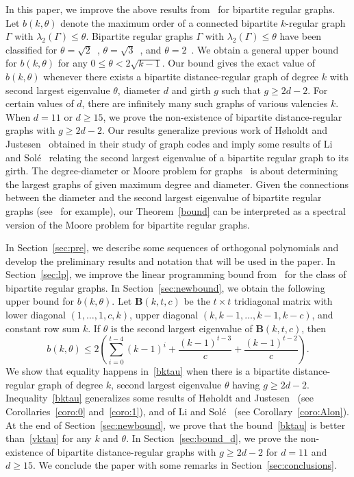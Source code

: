 \documentclass[ALCO,ThmDefs,Unicode,epreuves]{cedram}
\begin{document}
In this paper, we improve the above results from~\cite{CKNV16} for bipartite regular graphs. Let $b(k,\theta)$ denote the maximum order of a connected bipartite $k$-regular graph $\Gamma$ with $\lambda_2(\Gamma) \leq \theta$. Bipartite regular graphs $\Gamma$ with $\lambda_2(\Gamma) \leq \theta$ have been classified for $\theta=\sqrt{2}$~\cite{TY00}, $\theta=\sqrt{3}$~\cite{KS13}, and $\theta=2$~\cite{KS14}. We obtain a general upper bound for $b(k,\theta)$ for any $0\leq \theta< 2\sqrt{k-1}$. Our bound gives the exact value of $b(k,\theta)$ whenever there exists a bipartite distance-regular graph of degree $k$ with second largest eigenvalue $\theta$, diameter $d$ and girth $g$ such that $g\geq 2d-2$. For certain values of $d$, there are infinitely many such graphs of various valencies $k$. When $d=11$ or $d\geq 15$, we prove the non-existence of bipartite distance-regular graphs with $g\geq 2d-2$. Our results generalize previous work of H\o holdt and Justesen~\cite{HJ14} obtained in their study of graph codes and imply some results of Li and Sol\'{e}~\cite{CLS96} relating the second largest eigenvalue of a bipartite regular graph to its girth. The degree-diameter or Moore problem for graphs~\cite{MS} is about determining the largest graphs of given maximum degree and diameter. Given the connections between the diameter and the second largest eigenvalue of bipartite regular graphs (see~\cite{Ch89} for example), our Theorem~\ref{bound} can be interpreted as a spectral version of the Moore problem for bipartite regular graphs. 

In Section~\ref{sec:pre}, we describe some sequences of orthogonal polynomials and develop the preliminary results and notation that will be used in the paper. In Section~\ref{sec:lp}, we improve the linear programming bound from~\cite{N} for the class of bipartite regular graphs. In Section~\ref{sec:newbound}, we obtain the following upper bound for $b(k,\theta)$. Let $\boldsymbol{B}(k,t,c)$ be the $t \times t$ tridiagonal matrix with lower diagonal $(1,\ldots,1,c,k)$, upper diagonal $(k,k-1,\ldots, k-1,k-c)$, and constant row sum $k$. 
If $\theta$ is the second largest eigenvalue of $\boldsymbol{B}(k,t,c)$, then
\begin{equation}\label{bktau}
b(k,\theta) \leq 2\left(\sum_{i=0}^{t-4} (k-1)^{i}+ \frac{(k-1)^{t-3}}{c}+\frac{(k-1)^{t-2}}{c}\right). 
\end{equation}
We show that equality happens in~\eqref{bktau} when there is a bipartite distance-regular graph of degree $k$, second largest eigenvalue $\theta$ having $g\geq 2d-2$. Inequality~\eqref{bktau} generalizes some results of H\o holdt and Justesen~\cite{HJ14} (see Corollaries~\ref{coro:0} and~\ref{coro:1}), and of Li and Sol\'{e}~\cite{CLS96} (see Corollary~\ref{coro:Alon}). 
At the end of Section~\ref{sec:newbound}, we prove that the bound~\eqref{bktau} is better than~\eqref{vktau} for any $k$ and $\theta$. In Section~\ref{sec:bound_d}, we prove the non-existence of bipartite distance-regular graphs with $g\geq 2d-2$ for $d=11$ and $d\geq 15$. We conclude the paper with some remarks in Section~\ref{sec:conclusions}.
\end{document}

